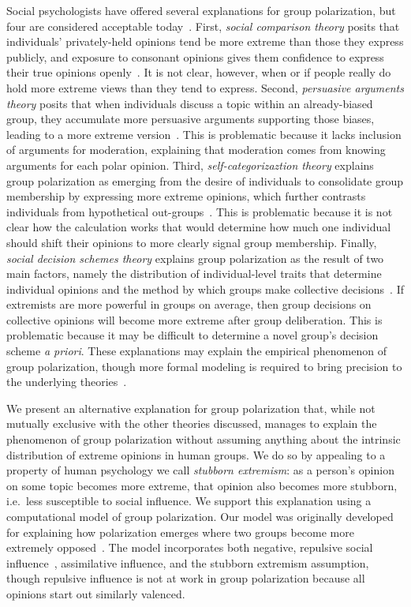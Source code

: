 Social psychologists have offered several explanations for group polarization, 
but four are considered acceptable today~\cite{Sieber2019}. 
First, \emph{social comparison theory} posits that individuals' privately-held 
opinions tend be more extreme than those they express publicly, and exposure to consonant 
opinions gives them confidence to express their true opinions openly~\cite{Myers1982}. 
It is not clear, however, when or if people really do hold more extreme views
than they tend to express.
Second, \emph{persuasive arguments theory} posits that when individuals discuss a topic within an already-biased group, 
they accumulate more persuasive arguments supporting those biases, leading to a more extreme version~\cite{Bishop1974,Vinokur1974}. 
This is problematic because it lacks inclusion of arguments for moderation, explaining that
moderation comes from knowing arguments for each polar opinion.
Third, \emph{self-categorizaztion theory} explains group polarization as emerging from
the desire of individuals to consolidate group membership by expressing more
extreme opinions, which further contrasts individuals from hypothetical out-groups~\cite{Turner1987,Abrams1990,McGarty1992}.
This is problematic because it is not clear how the calculation works that
would determine how much one individual should shift their opinions to more clearly
signal group membership.
Finally, \emph{social decision schemes theory} explains group polarization as the 
result of two main factors, namely the distribution of individual-level traits
that determine individual opinions and the method by which groups make collective decisions~\cite{Zuber1992,Friedkin1999a}.
If extremists are more powerful in groups on average, then group decisions
on collective opinions will become more extreme after group deliberation.
This is problematic because it may be difficult to determine a novel group's
decision scheme \emph{a priori}.
These explanations may explain the empirical phenomenon of group polarization, 
though more formal modeling is required to bring precision to the underlying 
theories~\cite{Smaldino2017StupidModels,Smaldino2019b}. 

We present an alternative explanation for group polarization that, while not mutually exclusive with the other theories discussed, manages to explain the phenomenon of group polarization without assuming anything about the intrinsic distribution of extreme opinions in human groups. We do so by appealing to a property of human psychology we call  
\emph{stubborn extremism}: as a person's opinion on
some topic becomes more extreme, that opinion also becomes more stubborn, 
i.e.\, less susceptible to social influence. 
We support this explanation using a computational model of group polarization. 
Our model was originally developed for explaining how polarization emerges
where two groups become more extremely opposed~\cite{Flache2011,Turner2018}.
The model incorporates both negative, repulsive social influence~\cite{Cikara2014}, assimilative influence,
and the stubborn extremism assumption, though repulsive influence is not at work
in group polarization because all opinions start out similarly valenced.   

